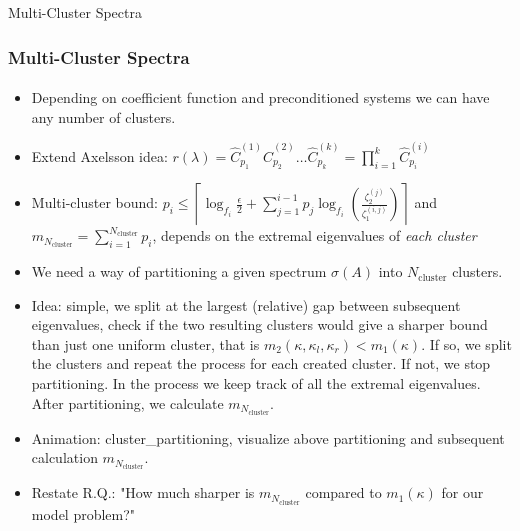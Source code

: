 \begin{frame}[label=multi_cluster]{Multi-Cluster Spectra}
    \frametitle{Multi-Cluster Spectra}
    \framesubtitle{}
        \begin{itemize}
            \item<1-> Depending on coefficient function and preconditioned systems we can have any number of clusters.
            \item<2-> Extend Axelsson idea: $r(\lambda) = \hat{C}^{(1)}_{p_1}\hat{C}^{(2)}_{p_2}\ldots\hat{C}^{(k)}_{p_k} = \prod_{i=1}^{k} \hat{C}^{(i)}_{p_i}$
            \item<3-> Multi-cluster bound: $p_i \leq \left\lceil\log_{f_i}{\frac{\epsilon}{2}} + \sum_{j=1}^{i-1} p_j\log_{f_i}\left(\frac{\zeta^{(j)}_2}{\zeta^{(i,j)}_1}\right)\right\rceil$ and $m_{N_{\text{cluster}}} = \sum_{i=1}^{N_{\text{cluster}}} p_i$, depends on the extremal eigenvalues of \textit{each cluster}
            \item<4-> We need a way of partitioning a given spectrum $\sigma(A)$ into $N_{\text{cluster}}$ clusters.
            \item<5-> Idea: simple, we split at the largest (relative) gap between subsequent eigenvalues, check if the two resulting clusters would give a sharper bound than just one uniform cluster, that is $m_2(\kappa, \kappa_l, \kappa_r) < m_1(\kappa)$. If so, we split the clusters and repeat the process for each created cluster. If not, we stop partitioning. In the process we keep track of all the extremal eigenvalues. After partitioning, we calculate $m_{N_{\text{cluster}}}$.
            \item<6-> Animation: cluster\_partitioning, visualize above partitioning and subsequent calculation $m_{N_{\text{cluster}}}$.
            \item<7-> Restate R.Q.: "How much sharper is $m_{N_{\text{cluster}}}$ compared to $m_1(\kappa)$ for our model problem?"
        \end{itemize}
\end{frame}